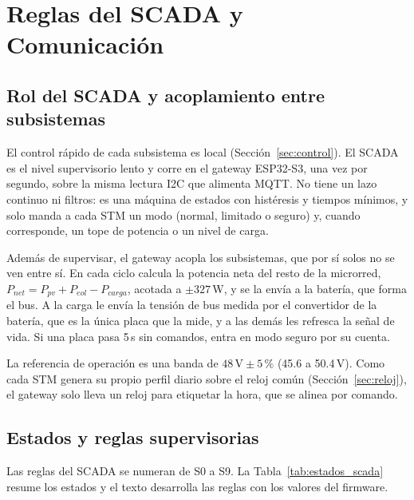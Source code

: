 \documentclass[conference]{IEEEtran}
\begin{document}
\section{Reglas del SCADA y Comunicación}
\label{app:scada}
\label{sec:scada}

\subsection{Rol del SCADA y acoplamiento entre subsistemas}

El control rápido de cada subsistema es local (Sección~\ref{sec:control}). El SCADA es el nivel supervisorio lento y corre en el gateway ESP32-S3, una vez por segundo, sobre la misma lectura I2C que alimenta MQTT. No tiene un lazo continuo ni filtros: es una máquina de estados con histéresis y tiempos mínimos, y solo manda a cada STM un modo (normal, limitado o seguro) y, cuando corresponde, un tope de potencia o un nivel de carga.

Además de supervisar, el gateway acopla los subsistemas, que por sí solos no se ven entre sí. En cada ciclo calcula la potencia neta del resto de la microrred, $P_{net}=P_{pv}+P_{eol}-P_{carga}$, acotada a $\pm327$\,W, y se la envía a la batería, que forma el bus. A la carga le envía la tensión de bus medida por el convertidor de la batería, que es la única placa que la mide, y a las demás les refresca la señal de vida. Si una placa pasa 5\,s sin comandos, entra en modo seguro por su cuenta.

La referencia de operación es una banda de $48\,\mathrm{V}\pm5\,\%$ (45.6 a 50.4\,V). Como cada STM genera su propio perfil diario sobre el reloj común (Sección~\ref{sec:reloj}), el gateway solo lleva un reloj para etiquetar la hora, que se alinea por comando.

\subsection{Estados y reglas supervisorias}

Las reglas del SCADA se numeran de S0 a S9. La Tabla~\ref{tab:estados_scada} resume los estados y el texto desarrolla las reglas con los valores del firmware.
\end{document}
